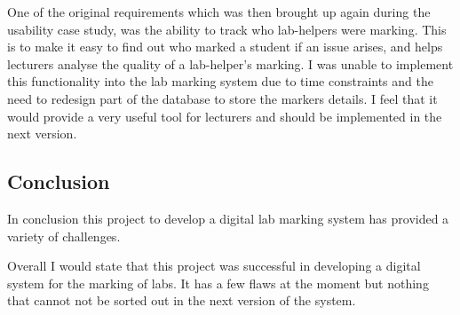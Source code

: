 \documentclass[12pt]{article}  %
\begin{document}
One of the original requirements which was then brought up again during the usability case study, was the ability to track who lab-helpers were marking. This is to make it easy to find out who marked a student if an issue arises, and helps lecturers analyse the quality of a lab-helper's marking. 
I was unable to implement this functionality into the lab marking system due to time constraints and the need to redesign part of the database to store the markers details. I feel that it would provide a very useful tool for lecturers and should be implemented in the next version.


\subsection{Conclusion}

In conclusion this project to develop a digital lab marking system has provided a variety of challenges.

Overall I would state that this project was successful in developing a digital system for the marking of labs. It has a few flaws at the moment but nothing that cannot not be sorted out in the next version of the system.











\newpage
\printbibliography[heading=bibintoc]
\let\cleardoublepage\clearpage


\end{document}
